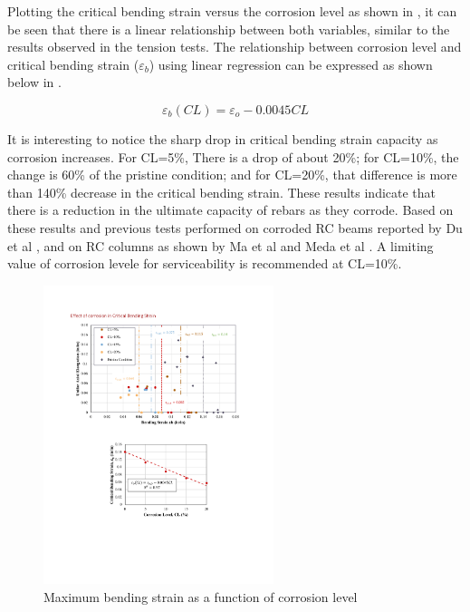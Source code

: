 Plotting the critical bending strain versus the corrosion level as shown in , it can be seen that there is a linear relationship between both variables, similar to the results observed in the tension tests. The relationship between corrosion level and critical bending strain ($\varepsilon_{b}$) using linear regression can be expressed as shown below in .

\begin{equation}
    \varepsilon_{b}(CL) = \varepsilon_{o}-0.0045CL
    \label{eq.Calderon_eb_vs_CL}
\end{equation}

It is interesting to notice the sharp drop in critical bending strain capacity as corrosion increases. For CL=5\%, There is a drop of about 20\%; for CL=10\%, the change is 60\% of the pristine condition; and for CL=20\%, that difference is more than 140\% decrease in the critical bending strain. These results indicate that there is a reduction in the ultimate capacity of rebars as they corrode. Based on these results and previous tests performed on corroded RC beams reported by Du et al \cite{Du2005}, and on RC columns as shown by Ma et al \cite{Ma2012} and Meda et al \cite{Meda2014}. A limiting value of corrosion levele for serviceability is recommended at CL=10\%.

\begin{figure}[htbp]
	\centering
	\includegraphics[width=0.6\textwidth]{VAC Thesis 2.0/Chapter-4/figs/BBT_results_summary.pdf}
	\caption{Maximum bending strain as a function of corrosion level}
	\label{fig:eb_vs_CL}
\end{figure}

